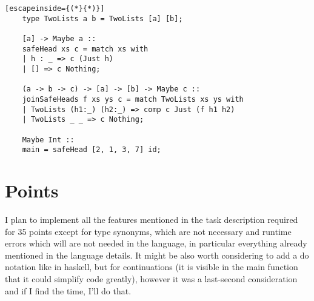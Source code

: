 \documentclass{article}
\begin{document}
	\begin{lstlisting}[escapeinside={(*}{*)}]
	type TwoLists a b = TwoLists [a] [b];
	
	[a] -> Maybe a ::
	safeHead xs c = match xs with
	| h : _ => c (Just h)
	| [] => c Nothing;
	
	(a -> b -> c) -> [a] -> [b] -> Maybe c ::
	joinSafeHeads f xs ys c = match TwoLists xs ys with
	| TwoLists (h1:_) (h2:_) => comp c Just (f h1 h2)
	| TwoLists _ _ => c Nothing;
	
	Maybe Int ::
	main = safeHead [2, 1, 3, 7] id;
	\end{lstlisting}
	\section{Points}
	I plan to implement all the features mentioned in the task description required for 35 points except
	for type synonyms, which are not necessary and runtime errors which will are not needed in the language, in particular everything already mentioned in the language details. It might be also worth considering to add a do notation like in haskell, but for continuations (it is visible in the main function that it could simplify code greatly), however it was a last-second consideration and if I find the time, I'll do that.
\end{document}
